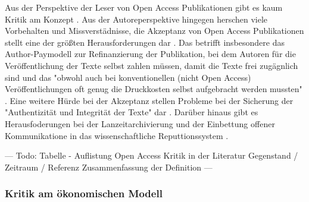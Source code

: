 Aus der Perspektive der Leser von Open Access Publikationen gibt es kaum Kritik am Konzept \cite{weishaupt_2009_goldenOA}. Aus der Autoreperspektive hingegen herschen viele Vorbehalten und Missverstädnisse, die Akzeptanz von Open Access Publikationen stellt eine der größten Herausforderungen dar \cite{weishaupt_2009_goldenOA} \cite{Suber_2002}. Das betrifft insbesondere das Author-Paymodell zur Refinanzierung der Publikation, bei dem Autoren für die Veröffentlichung der Texte selbst zahlen müssen, damit die Texte frei zugägnlich sind \cite{suchen} und das "obwohl auch bei konventionellen (nicht Open Access) Veröffentlichungen oft genug die Druckkosten selbst aufgebracht werden mussten" \cite{weishaupt_2009_goldenOA}. Eine weitere Hürde bei der Akzeptanz stellen Probleme bei der Sicherung der "Authentizität und Integrität der Texte" dar \cite{weishaupt_2009_goldenOA}. Darüber hinaus gibt es Herausfoderungen bei der Lanzeitarchivierung und der Einbettung offener Kommunikatione in das wissenschaftliche Reputtionssystem \cite{weishaupt_2009_goldenOA} \cite{Suber_2002} \cite{Adema_2014_open_access}.

--- Todo: Tabelle - Auflistung Open Access Kritik in der Literatur
Gegenstand / Zeitraum / Referenz
Zusammenfassung der Definition ---

\subsubsection{Kritik am ökonomischen Modell}


